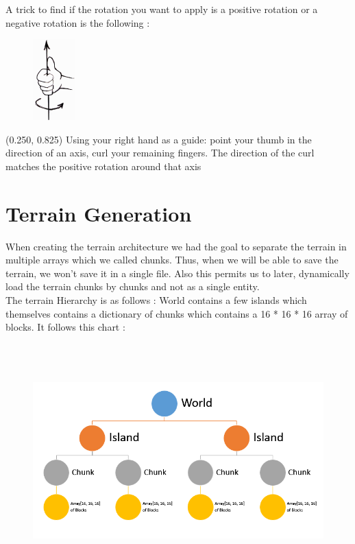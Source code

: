 \documentclass[article]{report} %
\begin{document}
			A trick to find if the rotation you want to apply is a positive rotation or a negative rotation is the following : \\
			\begin{figure}[h]
				\includegraphics[]{Images/RotationsPositive.png}
			\end{figure}
			\begin{textblock}{0.628}(0.250, 0.825)
							\noindent  Using your right hand as a guide: point your thumb in the direction of an axis, curl your remaining fingers. The direction of the curl matches the positive rotation around that axis
			\end{textblock}
			\section{Terrain Generation}
				When creating the terrain architecture we had the goal to separate the terrain in multiple arrays which we called chunks. Thus, when we will be able to save the terrain, we won't save it in a single file. Also this permits us to later, dynamically load the terrain chunks by chunks and not as a single entity. \\
				The terrain Hierarchy is as follows : World contains a few islands which themselves contains a dictionary of chunks which contains a 16 * 16 * 16 array of blocks. It follows this chart : 
				\begin{figure}[h]
					\includegraphics[width=18cm, height=9cm]{Images/WorldHierarchy.png}
				\end{figure}
\end{document}
